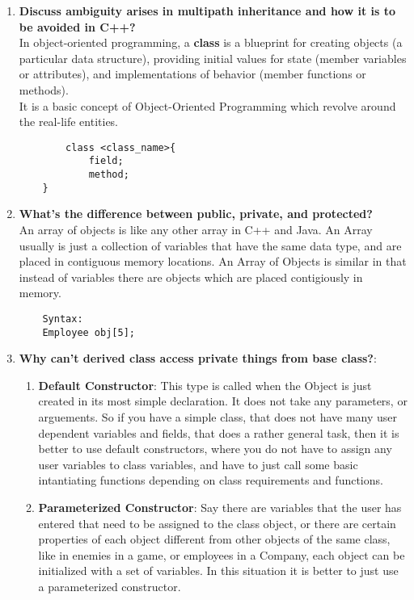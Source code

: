 \documentclass[11pt]{article}
\begin{document}
\begin{enumerate}
	\item \textbf{Discuss ambiguity arises in multipath inheritance and how it is to be avoided in C++?}\\

	      In object-oriented programming, a \textbf{class} is a blueprint for creating objects (a particular data structure), providing initial values for state (member variables or attributes), and implementations of behavior (member functions or methods).
	      \\ It is a basic concept of Object-Oriented Programming which revolve around the real-life entities.

	      \begin{verbatim}
		class <class_name>{  
			field;  
			method;  
  	}
	\end{verbatim}

	\item \textbf{What's the difference between public, private, and protected?} \\

	      An array of objects is like any other array in C++ and Java. An Array usually is just a collection of variables that have the same data type, and are placed in contiguous memory locations. An Array of Objects is similar in that instead of variables there are objects which are placed contigiously in memory.

	      \begin{verbatim}
	Syntax: 
	Employee obj[5];
	\end{verbatim}
	\item \textbf{Why can't derived class access private things from base class?}:
	      \begin{enumerate}
		      \item \textbf{Default Constructor}: This type is called when the Object is just created in its most simple declaration.
		            It does not take any parameters, or arguements. So if you have a simple class, that does not have many user dependent variables and fields, that does a rather general task, then it is better to use default constructors, where you do not have to assign any user variables to class variables, and have to just call some basic intantiating functions depending on class requirements and functions.

		      \item \textbf{Parameterized Constructor}: Say there are variables that the user has entered that need to be assigned to the class object, or there are certain properties of each object different from other objects of the same class, like in enemies in a game, or employees in a Company, each object can be initialized with a set of variables. In this situation it is better to just use a parameterized constructor.


\end{enumerate}
\end{enumerate}
\end{document}
